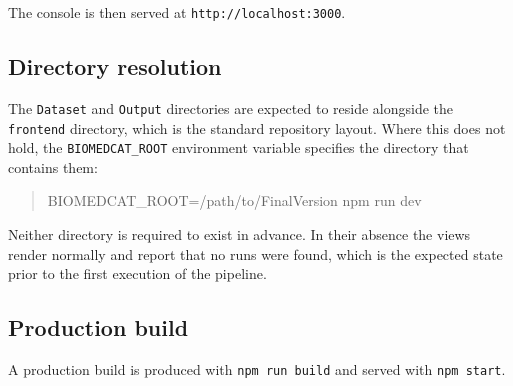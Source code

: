 \documentclass[11pt,a4paper]{article}
\begin{document}
\noindent The console is then served at \texttt{http://localhost:3000}.

\subsection{Directory resolution}

The \texttt{Dataset} and \texttt{Output} directories are expected to reside
alongside the \texttt{frontend} directory, which is the standard repository
layout. Where this does not hold, the \texttt{BIOMEDCAT\_ROOT} environment
variable specifies the directory that contains them:

\begin{quote}
\ttfamily
BIOMEDCAT\_ROOT=/path/to/FinalVersion npm run dev
\end{quote}

\noindent Neither directory is required to exist in advance. In their absence the
views render normally and report that no runs were found, which is the expected
state prior to the first execution of the pipeline.

\subsection{Production build}

A production build is produced with \texttt{npm run build} and served with
\texttt{npm start}.
\end{document}
